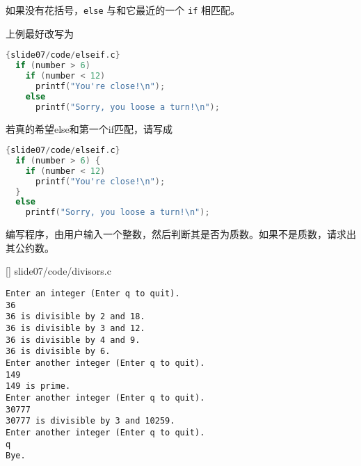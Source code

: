 \begin{frame}[fragile]
\begin{free}[规则]{}
如果没有花括号，\lstinline|else| 与和它最近的一个 \lstinline|if| 相匹配。
\end{free}
\end{frame}

\begin{frame}[fragile]
上例最好改写为
\begin{lstlisting}[language=c,frame=single]{slide07/code/elseif.c}
  if (number > 6)
    if (number < 12)
      printf("You're close!\n");
    else
      printf("Sorry, you loose a turn!\n");
\end{lstlisting}
\end{frame}

\begin{frame}[fragile]
若真的希望else和第一个if匹配，请写成
\begin{lstlisting}[language=c,frame=single]{slide07/code/elseif.c}
  if (number > 6) {
    if (number < 12)
      printf("You're close!\n");
  }
  else
    printf("Sorry, you loose a turn!\n");
\end{lstlisting}
\end{frame}

\begin{frame}[fragile]
  \begin{free}[例]{}
    编写程序，由用户输入一个整数，然后判断其是否为质数。如果不是质数，请求出其公约数。
  \end{free}
\end{frame}

\begin{frame}

[]
{slide07/code/divisors.c}
\end{frame}


\begin{frame}[fragile]
\begin{lstlisting}[backgroundcolor=\color{red!10}]
Enter an integer (Enter q to quit).
36
36 is divisible by 2 and 18.
36 is divisible by 3 and 12.
36 is divisible by 4 and 9.
36 is divisible by 6.
Enter another integer (Enter q to quit).
149
149 is prime.
Enter another integer (Enter q to quit).
30777
30777 is divisible by 3 and 10259.
Enter another integer (Enter q to quit).
q
Bye.
\end{lstlisting}
\end{frame}

